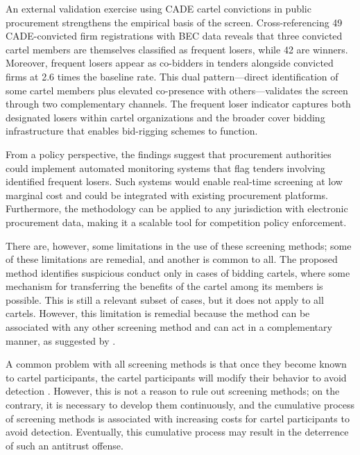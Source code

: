 An external validation exercise using CADE cartel convictions in public procurement strengthens the empirical basis of the screen. Cross-referencing 49 CADE-convicted firm registrations with BEC data reveals that three convicted cartel members are themselves classified as frequent losers, while 42 are winners. Moreover, frequent losers appear as co-bidders in tenders alongside convicted firms at 2.6 times the baseline rate. This dual pattern---direct identification of some cartel members plus elevated co-presence with others---validates the screen through two complementary channels. The frequent loser indicator captures both designated losers within cartel organizations and the broader cover bidding infrastructure that enables bid-rigging schemes to function.

From a policy perspective, the findings suggest that procurement authorities could implement automated monitoring systems that flag tenders involving identified frequent losers. Such systems would enable real-time screening at low marginal cost and could be integrated with existing procurement platforms. Furthermore, the methodology can be applied to any jurisdiction with electronic procurement data, making it a scalable tool for competition policy enforcement.

There are, however, some limitations in the use of these screening methods; some of these limitations are remedial, and another is common to all. The proposed method identifies suspicious conduct only in cases of bidding cartels, where some mechanism for transferring the benefits of the cartel among its members is possible. This is still a relevant subset of cases, but it does not apply to all cartels. However, this limitation is remedial because the method can be associated with any other screening method and can act in a complementary manner, as suggested by \citet{schinkel2013balancing}.

A common problem with all screening methods is that once they become known to cartel participants, the cartel participants will modify their behavior to avoid detection \citep{schinkel2013balancing}. However, this is not a reason to rule out screening methods; on the contrary, it is necessary to develop them continuously, and the cumulative process of screening methods is associated with increasing costs for cartel participants to avoid detection. Eventually, this cumulative process may result in the deterrence of such an antitrust offense.
